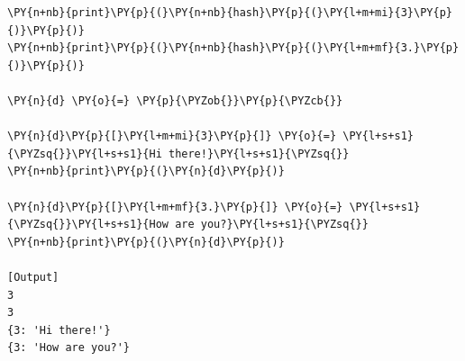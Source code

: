 \begin{Verbatim}[label=\makebox{\url{https://github.com/lucabaldini/cmepda/tree/master/slides/latex/snippets/dict\_hashing.py}},commandchars=\\\{\}]
\PY{n+nb}{print}\PY{p}{(}\PY{n+nb}{hash}\PY{p}{(}\PY{l+m+mi}{3}\PY{p}{)}\PY{p}{)}
\PY{n+nb}{print}\PY{p}{(}\PY{n+nb}{hash}\PY{p}{(}\PY{l+m+mf}{3.}\PY{p}{)}\PY{p}{)}

\PY{n}{d} \PY{o}{=} \PY{p}{\PYZob{}}\PY{p}{\PYZcb{}}

\PY{n}{d}\PY{p}{[}\PY{l+m+mi}{3}\PY{p}{]} \PY{o}{=} \PY{l+s+s1}{\PYZsq{}}\PY{l+s+s1}{Hi there!}\PY{l+s+s1}{\PYZsq{}}
\PY{n+nb}{print}\PY{p}{(}\PY{n}{d}\PY{p}{)}

\PY{n}{d}\PY{p}{[}\PY{l+m+mf}{3.}\PY{p}{]} \PY{o}{=} \PY{l+s+s1}{\PYZsq{}}\PY{l+s+s1}{How are you?}\PY{l+s+s1}{\PYZsq{}}
\PY{n+nb}{print}\PY{p}{(}\PY{n}{d}\PY{p}{)}

[Output]
3
3
{3: 'Hi there!'}
{3: 'How are you?'}
\end{Verbatim}